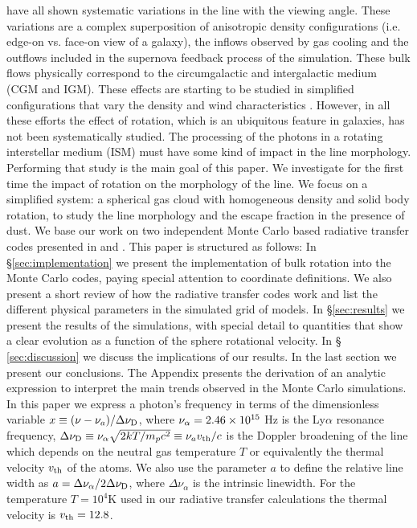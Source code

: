\citep{Laursen09,Barnes11,Verhamme12,Yajima12} have all shown
systematic variations in the \ly line with the viewing angle. These
variations are a complex superposition of anisotropic density
configurations (i.e. edge-on vs. face-on view of a galaxy), the
inflows observed by gas cooling and the outflows included in the
supernova feedback process of the simulation. These bulk flows
physically correspond to the circumgalactic and intergalactic medium
(CGM and IGM). These effects are starting to be studied
in simplified configurations that vary the density and wind
characteristics \citep{Zheng2013,Behrens2014}.
However, in all these efforts the effect of rotation,
which is an ubiquitous feature in galaxies, has not been
systematically studied. The processing of the \ly photons in a
rotating interstellar medium (ISM) must have some kind of impact in
the \ly line morphology.
Performing that study is the main goal of this paper. We investigate for the
first time the impact of rotation on the morphology of the \ly
line. We focus on a simplified system: a spherical gas cloud with
homogeneous density and solid body rotation, to study the line
morphology and the escape fraction in the presence of dust. We base
our work on two independent Monte Carlo based radiative transfer codes
presented in \cite{CLARA} and \cite{DijkstraKramer}.
This paper is structured as follows: In \S \ref{sec:implementation} we
present the implementation of bulk rotation into the Monte Carlo
codes, paying special attention to coordinate definitions. We also
present a short review of how the \ly radiative transfer codes work
and list the different physical parameters in the simulated grid of
models. In \S \ref{sec:results} we present the results of the
simulations, with special detail to quantities that show a
clear evolution as a function of the sphere rotational velocity. In \S
\ref{sec:discussion} we discuss the implications of our results. In
the last section we present our conclusions. The Appendix presents the
derivation of an analytic expression to interpret
the main trends observed in the Monte Carlo simulations.
In this paper we express a photon's frequency in terms of the
dimensionless variable $x\equiv (\nu -\nu_a)/\Delta\nu_{\rm D}$, where
$\nu_{\rm \alpha}=2.46\times 10^{15}$ Hz is the Ly$\alpha$ resonance
frequency, $\Delta\nu_{\rm D} \equiv
\nu_{\alpha}\sqrt{2kT/m_pc^2}\equiv \nu_av_{\rm th}/c $ is the Doppler
broadening of the line which depends on the neutral gas temperature
$T$ or equivalently the thermal velocity
$v_{\rm th}$ of the atoms. We also use the parameter $a$ to define the
relative line width as $a=\Delta\nu_{\alpha}/2\Delta\nu_{\rm D}$,
where $\Delta\nu_{\alpha}$ is the intrinsic linewidth. For the
temperature $T=10^4$K used in our radiative transfer calculations the
thermal velocity is $v_{\rm th}=12.8$\kms.
